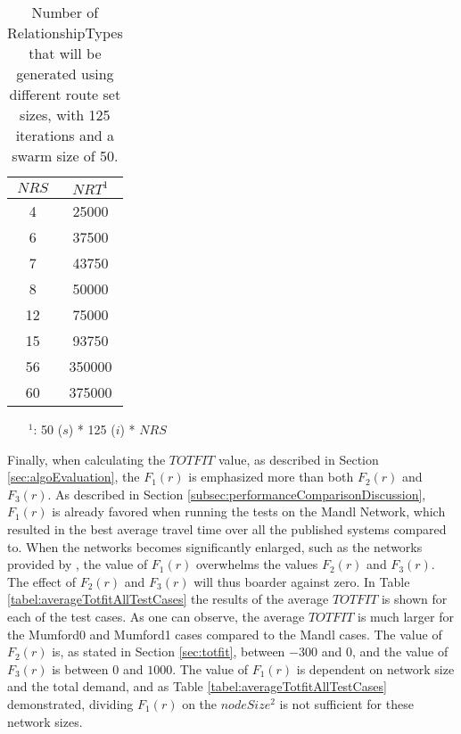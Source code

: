 \begin{table}[H]
    \centering
    \begin{tabular}{|c|c|}
        \hline
        \textbf{$NRS$} & \textbf{$NRT^1$}\\
        \hline
        4 & 25000\\
        
        6 & 37500\\
       
        7 & 43750\\
        
        8 & 50000\\
       
        12 & 75000\\
        
        15 & 93750\\
        
        56 & 350000\\
        
        60 & 375000\\
        \hline
    \end{tabular}
    \caption{Number of RelationshipTypes that will be generated using different route set sizes, with 125 iterations and a swarm size of 50.}
    \begin{itemize}[noitemsep]
    \item[$^1$:] 50 ($s$) * 125 ($i$) * $NRS$
    \end{itemize} 
    \label{tabel:numberOfRelationshipTypes}
\end{table} 

Finally, when calculating the $TOTFIT$ value, as described in Section \vref{sec:algoEvaluation}, the $F_1(r)$ is emphasized more than both $F_2(r)$ and $F_3(r)$. As described in Section \vref{subsec:performanceComparisonDiscussion}, $F_1(r)$ is already favored when running the tests on the Mandl Network, which resulted in the best average travel time over all the published systems compared to. When the networks becomes significantly enlarged, such as the networks provided by \citet{mumford13}, the value of $F_1(r)$ overwhelms the values $F_2(r)$ and $F_3(r)$. The effect of $F_2(r)$ and $F_3(r)$ will thus boarder against zero. In Table \ref{tabel:averageTotfitAllTestCases} the results of the average $TOTFIT$ is shown for each of the test cases. As one can observe, the average $TOTFIT$ is much larger for the Mumford0 and Mumford1 cases compared to the Mandl cases. The value of $F_2(r)$ is, as stated in Section \vref{sec:totfit}, between $-300$ and $0$, and the value of $F_3(r)$ is between $0$ and $1000$. The value of $F_1(r)$ is dependent on network size and the total demand, and as Table \vref{tabel:averageTotfitAllTestCases} demonstrated, dividing $F_1(r)$ on the $nodeSize^2$ is not sufficient for these network sizes. %

